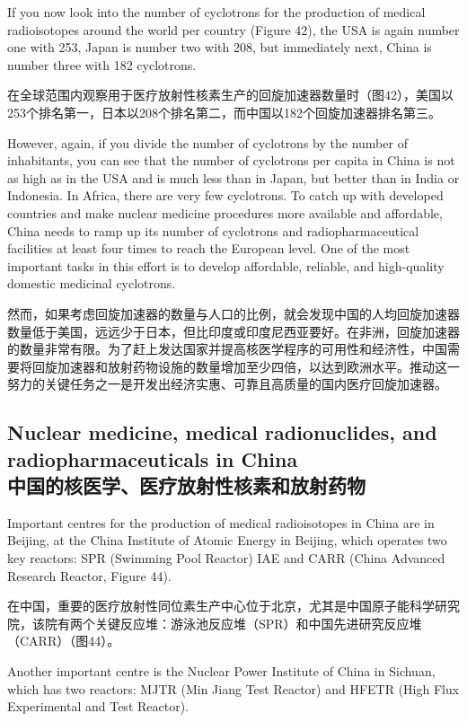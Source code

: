 \documentclass[dvipsnames, svgnames,a4paper,11pt]{article}
\begin{document}
If you now look into the number of cyclotrons for the production of medical radioisotopes around the world per country (Figure 42), the USA is again number one with 253, Japan is number two with 208, but immediately next, China is number three with 182 cyclotrons.  

在全球范围内观察用于医疗放射性核素生产的回旋加速器数量时（图42），美国以253个排名第一，日本以208个排名第二，而中国以182个回旋加速器排名第三。

However, again, if you divide the number of cyclotrons by the number of inhabitants, you can see that the number of cyclotrons per capita in China is not as high as in the USA and is much less than in Japan, but better than in India or Indonesia. In Africa, there are very few cyclotrons. To catch up with developed countries and make nuclear medicine procedures more available and affordable, China needs to ramp up its number of cyclotrons and radiopharmaceutical facilities at least four times to reach the European level. One of the most important tasks in this effort is to develop affordable, reliable, and high-quality domestic medicinal cyclotrons.  

然而，如果考虑回旋加速器的数量与人口的比例，就会发现中国的人均回旋加速器数量低于美国，远远少于日本，但比印度或印度尼西亚要好。在非洲，回旋加速器的数量非常有限。为了赶上发达国家并提高核医学程序的可用性和经济性，中国需要将回旋加速器和放射药物设施的数量增加至少四倍，以达到欧洲水平。推动这一努力的关键任务之一是开发出经济实惠、可靠且高质量的国内医疗回旋加速器。

\subsection{Nuclear medicine, medical radionuclides, and radiopharmaceuticals in China\\中国的核医学、医疗放射性核素和放射药物}

Important centres for the production of medical radioisotopes in China are in Beijing, at the China Institute of Atomic Energy in Beijing, which operates two key reactors: SPR (Swimming Pool Reactor) IAE and CARR (China Advanced Research Reactor, Figure 44).  

在中国，重要的医疗放射性同位素生产中心位于北京，尤其是中国原子能科学研究院，该院有两个关键反应堆：游泳池反应堆（SPR）和中国先进研究反应堆（CARR）（图44）。

Another important centre is the Nuclear Power Institute of China in Sichuan, which has two reactors: MJTR (Min Jiang Test Reactor) and HFETR (High Flux Experimental and Test Reactor).  
\end{document}
